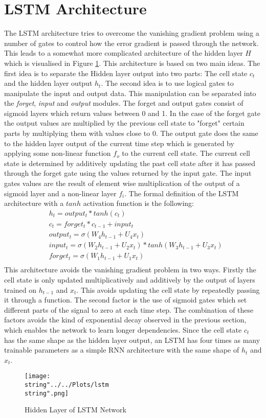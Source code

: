 \section{LSTM Architecture}
The LSTM architecture tries to overcome the vanishing gradient problem using a number of gates to control how the error gradient is passed through the network. This leads to a somewhat more complicated architecture of the hidden layer $H$ which is visualised in Figure \ref{fig:lstm}. This architecture is based on two main ideas. The first idea is to separate the Hidden layer output into two parts: The cell state $c_t$ and the hidden layer output $h_t$. The second idea is to use logical gates to manipulate the input and output data. This manipulation can be separated into the \textit{forget}, \textit{input} and \textit{output} modules. The forget and output gates consist of sigmoid layers which return values between 0 and 1. In the case of the forget gate the output values are multiplied by the previous cell state to "forget" certain parts by multiplying them with values close to 0.  The output gate does the same to the hidden layer output of the current time step which is generated by applying some non-linear function $f_o$ to the current cell state. The current cell state is determined by additively updating the past cell state after it has passed through the forget gate using the values returned by the input gate. The input gates values are the result of element wise multiplication of the output of a sigmoid layer and a non-linear layer $f_i$. The formal definition of the LSTM architecture with a $tanh$ activation function is the following:
\begin{align}
&h_t =output_t*tanh(c_t)\\
&c_t = forget_t*c_{t-1} + input_t\\
&output_t = \sigma(W_4h_{t-1} + U_4x_t)\\
&input_t =  \sigma(W_2h_{t-1} + U_2x_t)*tanh(W_3h_{t-1} + U_3x_t)\\
&forget_t =  \sigma(W_1h_{t-1} + U_1x_t)\\
\end{align}
This architecture avoids the vanishing gradient problem in two ways. Firstly the cell state is only updated multiplicatively and additively by the output of layers trained on $h_{t-1}$ and $x_t$. This avoids updating the cell state by repeatedly passing it through a function. The second factor is the use of sigmoid gates which set different parts of the signal to zero at each time step. The combination of these factors avoids the kind of exponential decay observed in the previous section, which enables the network to learn longer dependencies. Since the cell state $c_t$ has the same shape as the hidden layer output, an LSTM has four times as many trainable parameters as a simple RNN architecture with the same shape of $h_t$ and $x_t$.
\begin{figure}
  \centering
\texttt{[image: \\string"../../Plots/lstm\\string".png]}
  \caption{Hidden Layer of LSTM Network}\label{fig:lstm}
\end{figure}
